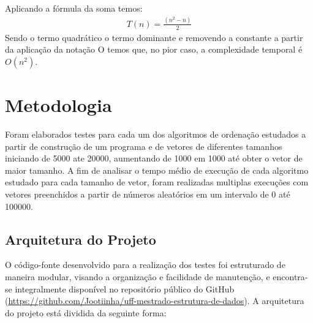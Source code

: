\documentclass[
	article,			%
	11pt,				%
	oneside,			%
	a4paper,			%
	english,			%
	brazil,				%
	sumario=tradicional
	]{abntex2}
\begin{document}
Aplicando a fórmula da soma temos:
\begin{equation}
\begin{gathered}
T(n) = \frac{(n^2-n)}2
\end{gathered}
\end{equation}
Sendo o termo quadrático o termo dominante e removendo a constante a partir da aplicação da notação O temos que, no pior caso, a complexidade temporal é  $O(n^2)$.


\section{Metodologia}
Foram elaborados testes para cada um dos algoritmos de ordenação estudados a partir de construção de um programa e de vetores de diferentes tamanhos iniciando de 5000 ate 20000, aumentando de 1000 em 1000 até obter o vetor de maior tamanho. A fim de analisar o tempo médio de execução de cada algoritmo estudado para cada tamanho de vetor, foram realizadas multiplas execuções com vetores preenchidos a partir de números aleatórios em um intervalo de 0 até 100000.

\subsection{Arquitetura do Projeto}

O código-fonte desenvolvido para a realização dos testes foi estruturado de maneira modular, visando a organização e facilidade de manutenção, e encontra-se integralmente disponível no repositório público do GitHub (\url{https://github.com/Jootiinha/uff-mestrado-estrutura-de-dados}). A arquitetura do projeto está dividida da seguinte forma:
\end{document}
